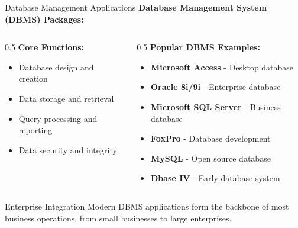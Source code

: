\documentclass[aspectratio=169]{beamer}
\begin{document}
\begin{frame}{Database Management Applications}
    \textbf{Database Management System (DBMS) Packages:}
    
    \begin{columns}
        \begin{column}{0.5\textwidth}
            \textbf{Core Functions:}
            \begin{itemize}
                \item Database design and creation
                \item Data storage and retrieval
                \item Query processing and reporting
                \item Data security and integrity
            \end{itemize}
            
        \end{column}
        \begin{column}{0.5\textwidth}
              \textbf{Popular DBMS Examples:}
            \begin{itemize}
                \item \textbf{Microsoft Access} - Desktop database
                \item \textbf{Oracle 8i/9i} - Enterprise database
                \item \textbf{Microsoft SQL Server} - Business database
                \item \textbf{FoxPro} - Database development
                \item \textbf{MySQL} - Open source database
                \item \textbf{Dbase IV} - Early database system
            \end{itemize}
        \end{column}
    \end{columns}
    
    \begin{exampleblock}{Enterprise Integration}
        Modern DBMS applications form the backbone of most business operations, from small businesses to large enterprises.
    \end{exampleblock}
\end{frame}
\end{document}

